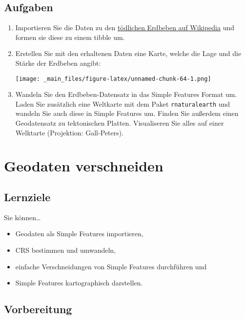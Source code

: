 \documentclass[11pt,german,a4paper]{article}
\providecommand{\tightlist}{%
  \setlength{\itemsep}{0pt}\setlength{\parskip}{0pt}}
\begin{document}
\hypertarget{aufgaben-2}{%
\subsection{Aufgaben}\label{aufgaben-2}}

\begin{enumerate}
\def\labelenumi{\arabic{enumi}.}
\item
  Importieren Sie die Daten zu den \href{https://en.wikipedia.org/wiki/List_of_deadly_earthquakes_since_1900}{tödlichen Erdbeben auf Wikipedia}
  und formen sie diese zu einem tibble um.
\item
  Erstellen Sie mit den erhaltenen Daten eine Karte, welche die Lage und die Stärke der Erdbeben angibt:

  \texttt{[image: \_main\_files/figure-latex/unnamed-chunk-64-1.png]}
\item
  Wandeln Sie den Erdbeben-Datensatz in das Simple Features Format um. Laden Sie zusätzlich eine Weltkarte mit dem Paket \texttt{rnaturalearth} und wandeln Sie auch diese in Simple Features um. Finden Sie außerdem einen Geodatensatz zu tektonischen Platten. Visualiseren Sie alles auf einer Welktarte (Projektion: Gall-Peters).
\end{enumerate}

\hypertarget{geodaten-verschneiden}{%
\section{Geodaten verschneiden}\label{geodaten-verschneiden}}

\hypertarget{lernziele}{%
\subsection{Lernziele}\label{lernziele}}

Sie können\ldots{}

\begin{itemize}
\tightlist
\item
  Geodaten als Simple Features importieren,
\item
  CRS bestimmen und umwandeln,
\item
  einfache Verschneidungen von Simple Features durchführen und
\item
  Simple Features kartographisch darstellen.
\end{itemize}

\hypertarget{vorbereitung-1}{%
\subsection{Vorbereitung}\label{vorbereitung-1}}
\end{document}
